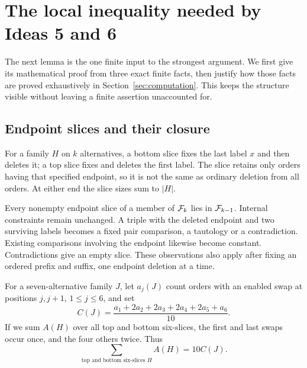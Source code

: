 \section{The local inequality needed by Ideas 5 and 6}\label{sec:local}
The next lemma is the one finite input to the strongest argument.
We first give its mathematical proof from three exact finite facts,
then justify how those facts are proved exhaustively in
Section~\ref{sec:computation}. This keeps the structure visible without
leaving a finite assertion unaccounted for.

\subsection{Endpoint slices and their closure}
For a family \(H\) on \(k\) alternatives, a bottom slice fixes the
last label \(x\) and then deletes it; a top slice fixes and deletes
the first label. The slice retains only orders having that specified
endpoint, so it is not the same as ordinary deletion from all orders.
At either end the slice sizes sum to \(|H|\).

Every nonempty endpoint slice of a member of \(\mathcal F_k\) lies in
\(\mathcal F_{k-1}\). Internal constraints remain unchanged. A triple with
the deleted endpoint and two surviving labels becomes a fixed pair
comparison, a tautology or a contradiction. Existing comparisons
involving the endpoint likewise become constant. Contradictions give
an empty slice. These observations also apply after fixing an ordered
prefix and suffix, one endpoint deletion at a time.

For a seven-alternative family \(J\), let \(a_j(J)\) count orders
with an enabled swap at positions \(j,j+1\), \(1\leq j\leq6\), and set
\[
 C(J)=\frac{a_1+2a_2+2a_3+2a_4+2a_5+a_6}{10}.
\]
If we sum \(A(H)\) over all top and bottom six-slices, the first
and last swaps occur once, and the four others twice. Thus
\begin{equation}\label{eq:costcount}
 \sum_{\text{top and bottom six-slices }H}A(H)=10C(J).
\end{equation}

